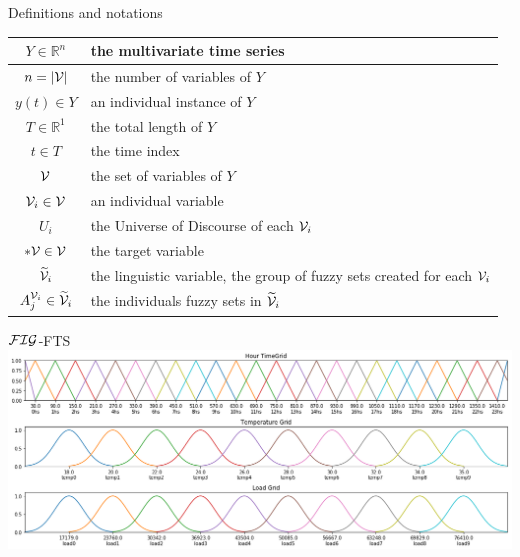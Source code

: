 \documentclass{beamer}
\begin{document}
\begin{frame}{Definitions and notations}
\begin{table}[]
    \centering
    \begin{tabular}{|c|m{7cm}|} \hline
        $Y \in \mathbb{R}^n$ &  the multivariate time series \\ \hline
        $n = |\mathcal{V}|$ & the number of variables of $Y$  \\ \hline
        $y(t) \in Y$ & an individual instance of $Y$ \\ \hline
        $T \in \mathbb{R}^1$ & the total length of $Y$ \\ \hline
        $t \in T$ & the time index \\ \hline
        $\mathcal{V}$ & the set of variables of $Y$ \\ \hline
        $\mathcal{V}_i \in \mathcal{V}$ & an individual variable \\ \hline
        $U_i$ & the Universe of Discourse of each  $\mathcal{V}_i$ \\ \hline
        $*\mathcal{V} \in \mathcal{V}$ & the target variable \\ \hline
        $\widetilde{\mathcal{V}}_i$ & the linguistic variable, the group of fuzzy sets created for each $\mathcal{V}_i$ \\ \hline
        $A_j^{\mathcal{V}_i} \in \widetilde{\mathcal{V}}_i$ & the individuals fuzzy sets in $\widetilde{\mathcal{V}}_i$ \\ \hline
    \end{tabular}
\end{table}
\end{frame}


\begin{frame}{$\mathcal{FIG}$-FTS}
\includegraphics[width=\textwidth]{figures/variables_malaysia.png}
\end{frame}
\end{document}
